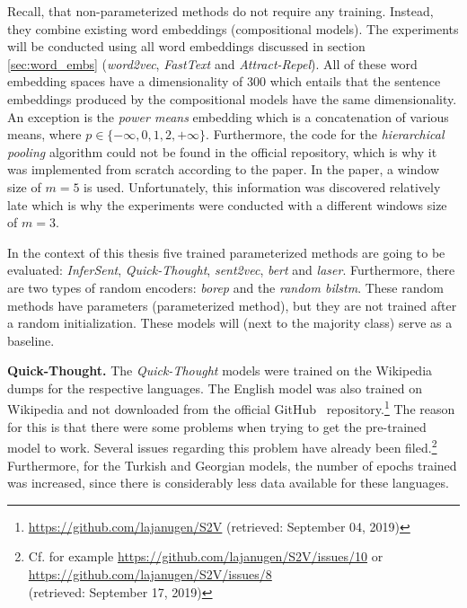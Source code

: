  Recall, that non-parameterized methods do not require any training. Instead, they combine existing word embeddings (compositional models). The experiments will be conducted using all word embeddings discussed in section \vref{sec:word_embs} (\textit{word2vec}, \textit{FastText} and \textit{Attract-Repel}). All of these word embedding spaces have a dimensionality of 300 which entails that the sentence embeddings produced by the compositional models have the same dimensionality. An exception is the \textit{power means} embedding which is a concatenation of various means, where $p \in \{ -\infty, 0, 1, 2, +\infty \}$. Furthermore, the code for the \textit{hierarchical pooling} algorithm could not be found in the official repository, which is why it was implemented from scratch according to the paper. In the paper, a window size of $m = 5$ is used. Unfortunately, this information was discovered relatively late which is why the experiments were conducted with a different windows size of $m = 3$.

 In the context of this thesis five trained parameterized methods are going to be evaluated: \textit{InferSent}, \textit{Quick-Thought}, \textit{sent2vec}, \textit{\gls{bert}} and \textit{\gls{laser}}. Furthermore, there are two types of random encoders: \textit{\gls{borep}} and the \textit{random \gls{bilstm}}. These random methods have parameters (parameterized method), but they are not trained after a random initialization. These models will (next to the majority class) serve as a baseline.

\textbf{Quick-Thought.} The \textit{Quick-Thought} models were trained on the Wikipedia dumps for the respective languages. The English model was also trained on Wikipedia and not downloaded from the official GitHub\github~ repository.\footnote{\url{https://github.com/lajanugen/S2V} (retrieved: September 04, 2019)} The reason for this is that there were some problems when trying to get the pre-trained model to work. Several issues regarding this problem have already been filed.\footnote{Cf. for example \url{https://github.com/lajanugen/S2V/issues/10} or \url{https://github.com/lajanugen/S2V/issues/8} \\ (retrieved: September 17, 2019)} Furthermore, for the Turkish and Georgian models, the number of epochs trained was increased, since there is considerably less data available for these languages.

